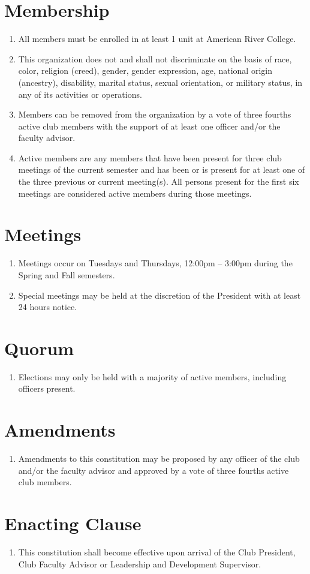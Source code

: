 \documentclass[14pt]{article}
\begin{document}
\section{Membership}
\begin{enumerate}
  \item All members must be enrolled in at least 1 unit at American River College.
  \item This organization does not and shall not discriminate on the basis of race, color, religion (creed), gender, gender expression, age, national origin (ancestry), disability, marital status, sexual orientation, or military status, in any of its activities or operations.
  \item Members can be removed from the organization by a vote of three fourths active club members with the support of at least one officer and/or the faculty advisor.
  \item Active members are any members that have been present for three club meetings of the current semester and has been or is present for at least one of the three previous or current meeting(s). All persons present for the first six meetings are considered active members during those meetings.
\end{enumerate}

\section{Meetings}
\begin{enumerate}
  \item Meetings occur on Tuesdays and Thursdays, 12:00pm – 3:00pm during the Spring and Fall semesters.
  \item Special meetings may be held at the discretion of the President with at least 24 hours notice.
\end{enumerate}

\section{Quorum}
\begin{enumerate}
  \item Elections may only be held with a majority of active members, including officers present.
\end{enumerate}

\section{Amendments}
\begin{enumerate}
  \item Amendments to this constitution may be proposed by any officer of the club and/or the faculty advisor and approved by a vote of three fourths active club members.
\end{enumerate}

\section{Enacting Clause}
\begin{enumerate}
  \item This constitution shall become effective upon arrival of the Club President, Club Faculty Advisor or Leadership and Development Supervisor.
\end{enumerate}
\end{document}
